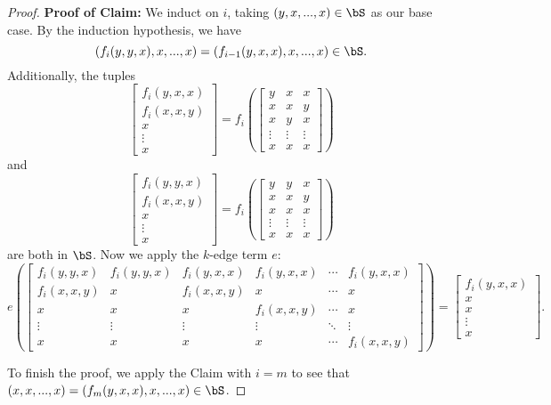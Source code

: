 \begin{proof}
{\bf Proof of Claim:} We induct on $i$, taking $(y,x,...,x) \in \bS$ as our base case. By the induction hypothesis, we have
\[
(f_i(y,y,x),x,...,x) = (f_{i-1}(y,x,x),x,...,x) \in \bS.
\]
Additionally, the tuples
\[
\begin{bmatrix} f_i(y,x,x)\\ f_i(x,x,y)\\ x\\ \vdots \\ x\end{bmatrix} = f_i\left(\begin{bmatrix} y & x & x\\ x & x & y\\ x & y & x\\ \vdots & \vdots & \vdots \\ x & x & x\end{bmatrix}\right)
\]
and
\[
\begin{bmatrix} f_i(y,y,x)\\ f_i(x,x,y)\\ x\\ \vdots \\ x\end{bmatrix} = f_i\left(\begin{bmatrix} y & y & x\\ x & x & y\\ x & x & x\\ \vdots & \vdots & \vdots \\ x & x & x\end{bmatrix}\right)
\]
are both in $\bS$. Now we apply the $k$-edge term $e$:
\[
e\left(\begin{bmatrix} f_i(y,y,x) & f_i(y,y,x) & f_i(y,x,x) & f_i(y,x,x) & \cdots & f_i(y,x,x)\\ f_i(x,x,y) & x & f_i(x,x,y) & x & \cdots & x\\ x & x & x & f_i(x,x,y) & \cdots & x\\ \vdots & \vdots & \vdots & \vdots & \ddots & \vdots \\ x & x & x & x & \cdots & f_i(x,x,y)\end{bmatrix}\right) = \begin{bmatrix} f_i(y,x,x)\\ x\\ x\\ \vdots \\ x\end{bmatrix}.
\]

To finish the proof, we apply the Claim with $i = m$ to see that $(x,x,...,x) = (f_m(y,x,x),x,...,x) \in \bS$.
\end{proof}


